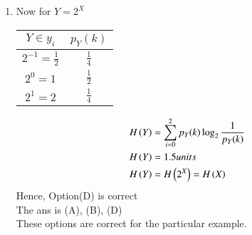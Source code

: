 \documentclass[journal,12pt,onecolumn]{IEEEtran}
\theoremstyle{remark}
\begin{document}
\begin{enumerate}
 \item Now for $Y = 2^X$\\
 \begin{table}[htpb]
\centering 
\begin{tabular}{|c|c|}
\hline
$Y \in y_i$	&	$p_Y(k)$\\
\hline
$2^{-1} = \frac{1}{2}$                         & $\frac{1}{4} $ \\
\hline
$2^0 = 1$                          & $\frac{1}{2}$  \\
\hline
$2^1 = 2$                          & $\frac{1}{4} $ \\
\hline
\end{tabular}
\end{table}
\begin{align}
H\left(Y\right) &= \sum_{i=0}^{2}p_Y(k) \log _{2} \frac{1}{p_Y(k)}\\
H\left(Y\right) &=  1.5 units\\
  H\left(Y\right) &= H\left(2^X\right) =H\left(X\right)
 \end{align}
 Hence, Option(D) is correct\\
 The ans is (A), (B), (D)\\
 These options are correct for the particular example.
 \end{enumerate}
\end{document}
